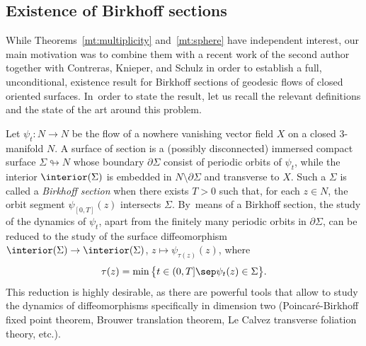 \subsection{Existence of Birkhoff sections}

While Theorems~\ref{mt:multiplicity} and~\ref{mt:sphere} have independent interest, our main motivation was to combine them with a recent work of the second author together with Contreras, Knieper, and Schulz \cite{Contreras:2022ab} in order to establish a full, unconditional, existence result for Birkhoff sections of geodesic flows of closed oriented surfaces. In~order to state the result, let us recall the relevant definitions and the state of the art around this problem.

Let $\psi_t:N\to N$ be the flow of a nowhere vanishing vector field $X$ on a closed 3-manifold $N$. A surface of section is a (possibly disconnected) immersed compact surface $\Sigma \looparrowright N$ whose boundary $\partial \Sigma$ consist of periodic orbits of $\psi_t$, while the interior $\interior(\Sigma)$ is embedded in $N \setminus \partial \Sigma$ and transverse to $X$. Such a $\Sigma$ is called a \emph{Birkhoff section} when there exists $T>0$ such that, for each $z\in N$, the orbit segment $\psi_{[0,T]}(z)$ intersects $\Sigma$. By~means of a Birkhoff section, the study of the dynamics of $\psi_t$, apart from the finitely many periodic orbits in $\partial\Sigma$, can be reduced to the study of the surface diffeomorphism $\interior(\Sigma)\to\interior(\Sigma)$, $z\mapsto\psi_{\tau(z)}(z)$, where\vspace*{-3pt}
\[
\tau(z)=\min\big\{t\in(0,T]\sep \psi_t(z)\in\Sigma \big\}.
\]
This reduction is highly desirable, as there are powerful tools that allow to study the dynamics of diffeomorphisms specifically in dimension two (\eg Poincaré-Birkhoff fixed point theorem, Brouwer translation theorem, Le Calvez transverse foliation theory, etc.).

